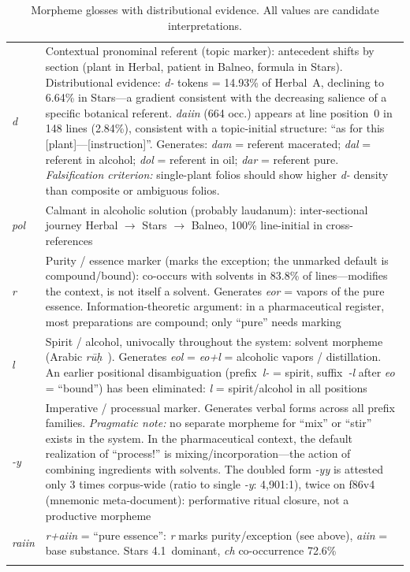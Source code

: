 \documentclass[11pt,a4paper]{article}
\begin{document}
\begin{longtable}{lp{9.5cm}}
\textit{d} & Contextual pronominal referent (topic marker): antecedent shifts by section (plant in Herbal, patient in Balneo, formula in Stars). Distributional evidence: \textit{d-} tokens = 14.93\% of Herbal~A, declining to 6.64\% in Stars---a gradient consistent with the decreasing salience of a specific botanical referent. \textit{daiin} (664 occ.) appears at line position~0 in 148 lines (2.84\%), consistent with a topic-initial structure: ``as for this [plant]---[instruction]''. Generates: \textit{dam} = referent macerated; \textit{dal} = referent in alcohol; \textit{dol} = referent in oil; \textit{dar} = referent pure. \textit{Falsification criterion:} single-plant folios should show higher \textit{d-} density than composite or ambiguous folios. \\
\textit{pol} & Calmant in alcoholic solution (probably laudanum): inter-sectional journey Herbal $\rightarrow$ Stars $\rightarrow$ Balneo, 100\% line-initial in cross-references \\
\textit{r} & Purity / essence marker (marks the exception; the unmarked default is compound/bound): co-occurs with solvents in 83.8\% of lines---modifies the context, is not itself a solvent. Generates \textit{eor} = vapors of the pure essence. Information-theoretic argument: in a pharmaceutical register, most preparations are compound; only ``pure'' needs marking \\
\textit{l} & Spirit / alcohol, univocally throughout the system: solvent morpheme (Arabic \textit{r\=u\d{h}}\ ). Generates \textit{eol} = \textit{eo+l} = alcoholic vapors / distillation. An earlier positional disambiguation (prefix~\textit{l-} = spirit, suffix~\textit{-l} after \textit{eo} = ``bound'') has been eliminated: \textit{l} = spirit/alcohol in all positions \\
\textit{-y} & Imperative / processual marker. Generates verbal forms across all prefix families. \textit{Pragmatic note:} no separate morpheme for ``mix'' or ``stir'' exists in the system. In the pharmaceutical context, the default realization of ``process!'' is mixing/incorporation---the action of combining ingredients with solvents. The doubled form \textit{-yy} is attested only 3 times corpus-wide (ratio to single \textit{-y}: 4,901:1), twice on f86v4 (mnemonic meta-document): performative ritual closure, not a productive morpheme \\
\textit{raiin} & \textit{r+aiin} = ``pure essence'': \textit{r} marks purity/exception (see above), \textit{aiin} = base substance. Stars 4.1\,\textperthousand{} dominant, \textit{ch} co-occurrence 72.6\% \\
\bottomrule
\caption{Morpheme glosses with distributional evidence. All values are candidate interpretations.}
\end{longtable}
\end{document}
